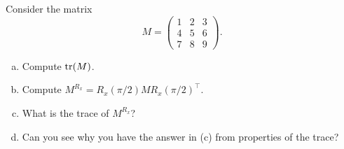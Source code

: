 \documentclass[12pt]{article} %
\begin{document}
\begin{problem}
Consider the matrix 
\[
M = \begin{pmatrix} 1 & 2 & 3 \\ 4 & 5 & 6 \\ 7 & 8 & 9 \end{pmatrix}.
\]
\begin{enumerate}[(a)]
    \item Compute $\mathrm{tr}(M)$. 
    \item Compute $M^{R_x}=R_x(\pi/2)MR_x(\pi/2)^\top$.
    \item What is the trace of $M^{R_x}$?
    \item Can you see why you have the answer in (c) from properties of the trace?
\end{enumerate}
\end{problem}
\end{document}
